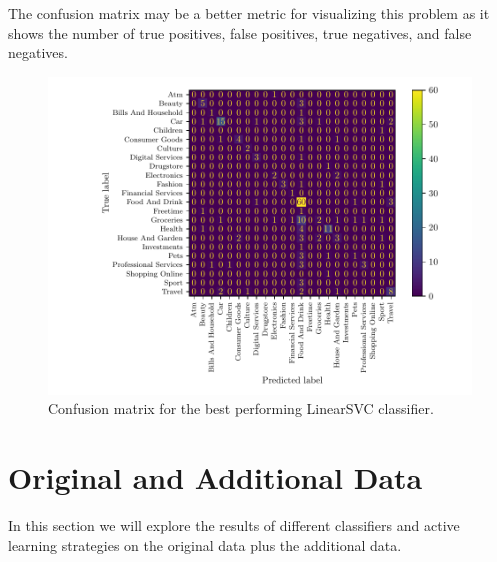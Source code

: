 The confusion matrix may be a better metric for visualizing this problem as it shows the number of true positives, false positives, true negatives, and false negatives. 

\begin{figure}[ht]
  \centering
  \includegraphics[width=\textwidth]{../img/plot_cm_LinearSVC.pdf}
  \caption{Confusion matrix for the best performing LinearSVC classifier.}
  \label{fig:confusion_matrix}
\end{figure}


\section{Original and Additional Data}

In this section we will explore the results of different classifiers and active learning strategies on the original data plus the additional data.